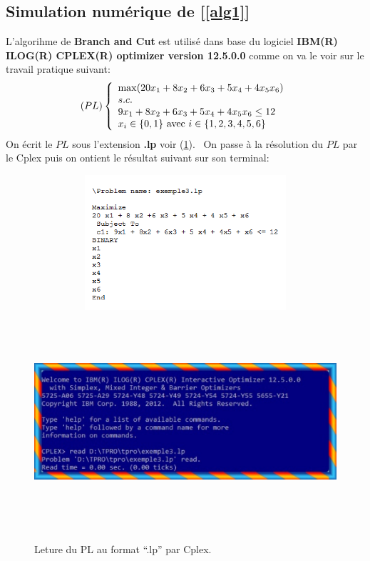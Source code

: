 \documentclass[a4paper,11pt,oneside]{report}
\theoremstyle{plain}
\newcommand{\0}{/ \! \! \! 0}
\theoremstyle{plain}
\begin{document}
\subsection*{Simulation num\'erique de [\ref{alg1}]}
L'algorihme de {\bf Branch and Cut} est utilis\'e dans base du logiciel {\bf IBM(R) ILOG(R) CPLEX(R) optimizer version 12.5.0.0}
comme on va le voir sur le travail pratique suivant:
\[
(PL) \left\{\begin{array}{l}
         \max ( 20x_1 + 8x_2 + 6x_3 + 5x_4 + 4x_5 x_6)\\
         s.c.  \\
         9x_1 + 8x_2 + 6x_3 + 5x_4 + 4x_5 x_6 \leq 12\\
         x_i \in \{0,1\}\,\, \textnormal{avec} \,\, i\in \{1,2,3,4,5,6\}
        \end{array}
 \right.
\]
On \'ecrit le $PL$ sous l'extension {\bf .lp } voir (\ref{fig2}). \,
On passe \`a la r\'esolution du $PL$ par le Cplex puis on ontient le r\'esultat suivant sur son terminal:
  \begin{figure}[htbp]
  \begin{center}
  \includegraphics[height=5cm,width=12cm]{formalp.png}
  \includegraphics[height=8cm,width=16cm]{tp1.pdf}
  \caption{\label{fig2}Leture du PL au format ``.lp'' par Cplex.}
  \end{center}
  \end{figure}
\end{document}
